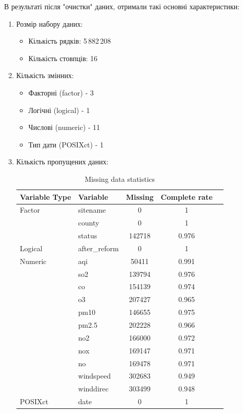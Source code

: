 \documentclass[./report.tex]{subfiles}
\begin{document}
В результаті після "очистки" даних, отримали такі основні характеристики:
 \begin{enumerate}      
    \item Розмір набору даних: 
        \begin{itemize}
            \item Кількість рядків: 5\,882\,208
            \item Кількість стовпців: 16
        \end{itemize} 
    \item Кількість змінних:
        \begin{itemize}
            \item Факторні (factor)  - 3
            \item Логічні (logical) -  1
            \item Числові (numeric) -  11
            \item Тип дати (POSIXct) -  1 
        \end{itemize} 

    \pagebreak
    \item Кількість пропущених даних:
    
    \begin{table}[h!]
    \centering
\begin{tabular}{llccc}

\hline
\textbf{Variable Type} & \textbf{Variable} & \textbf{Missing} & \textbf{Complete rate} \\
\hline
Factor   & sitename      & 0      & 1     \\
         & county        & 0      & 1     \\
         & status        & 142718 & 0.976 \\
Logical  & after\_reform & 0      & 1     \\
Numeric  & aqi           & 50411  & 0.991 \\
         & so2           & 139794 & 0.976 \\
         & co            & 154139 & 0.974 \\
         & o3            & 207427 & 0.965 \\
         & pm10          & 146655 & 0.975 \\
         & pm2.5         & 202228 & 0.966 \\
         & no2           & 166000 & 0.972 \\
         & nox           & 169147 & 0.971 \\
         & no            & 169478 & 0.971 \\
         & windspeed     & 302683 & 0.949 \\
         & winddirec     & 303499 & 0.948 \\
POSIXct  & date          & 0      & 1     \\
\end{tabular}
\caption{Missing data statistics}
\label{tab:summary}
\end{table}


\end{enumerate}
\end{document}
